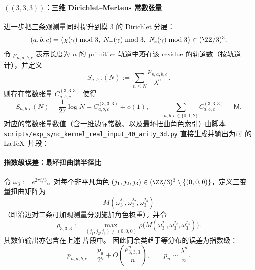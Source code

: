 \paragraph{\texorpdfstring{$((3,3,3))$}{(3,3,3)}：三维 Dirichlet--Mertens 常数张量}
进一步把三条观测量同时提升到模 $3$ 的 Dirichlet 分层：
$$
(a,b,c)=\bigl(\chi(\gamma)\bmod 3,\ N_-(\gamma)\bmod 3,\ N_e(\gamma)\bmod 3\bigr)\in(\ZZ/3)^3.
$$
令 $p_{n,a,b,c}$ 表示长度为 $n$ 的 primitive 轨道中落在该 residue 的轨道数（按轨道计），并定义
$$
S_{a,b,c}(N):=\sum_{n\le N}\frac{p_{n,a,b,c}}{\lambda^n}.
$$
则存在常数张量 $C^{(3,3,3)}_{a,b,c}$ 使得
$$
S_{a,b,c}(N)=\frac{1}{27}\log N + C^{(3,3,3)}_{a,b,c}+o(1),
\qquad
\sum_{a,b,c\in\{0,1,2\}} C^{(3,3,3)}_{a,b,c}=\mathsf{M}.
$$
对应的常数张量数值（含一维边际常数、以及最坏扭曲角色索引）由脚本
\texttt{scripts/exp\_sync\_kernel\_real\_input\_40\_arity\_3d.py}
直接生成并输出为可 \verb|| 的 \LaTeX\ 片段：


\paragraph{指数级误差：最坏扭曲谱半径比}
令 $\omega_3:=e^{2\pi i/3}$。对每个非平凡角色 $(j_1,j_2,j_3)\in(\ZZ/3)^3\setminus\{(0,0,0)\}$，定义三变量扭曲矩阵为
$$
M(\omega_3^{j_1},\omega_3^{j_2},\omega_3^{j_3})
$$
（即沿边对三条可加观测量分别施加角色权重），并令
$$
\rho_{3,3,3}
:=
\max_{(j_1,j_2,j_3)\neq(0,0,0)}
\rho\bigl(M(\omega_3^{j_1},\omega_3^{j_2},\omega_3^{j_3})\bigr).
$$
其数值输出亦包含在上述 \verb|| 片段中。
因此同余类趋于等分布的误差为指数级：
$$
p_{n,a,b,c}=\frac{p_n}{27}+O\!\left(\frac{\rho_{3,3,3}^n}{n}\right),
\qquad
p_n\sim\frac{\lambda^n}{n}.
$$
